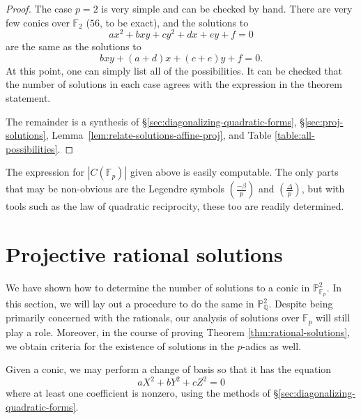 \documentclass[10pt,a4paper]{amsart}
\numberwithin{equation}{section}
\numberwithin{figure}{section}
\numberwithin{table}{section}
\theoremstyle{definition}
\theoremstyle{plain}
\theoremstyle{remark}
\theoremstyle{plain}
\theoremstyle{definition}
\theoremstyle{plain}
\theoremstyle{plain}
\newcommand{\legendre}[2]{\genfrac{(}{)}{}{}{#1}{#2}}
\renewcommand{\P}{\mathbb{P}}
\newcommand{\F}{\mathbb{F}}
\newcommand{\Q}{\mathbb{Q}}
\begin{document}
	\begin{proof} 
		The case $p=2$ is very simple and can be checked by hand. There are very few conics over $\F_2$ ($56$, to be exact), and the solutions to 
		\[ ax^2 + bxy + cy^2 + dx + ey + f = 0 \] 
		are the same as the solutions to 
		\[ bxy + (a+d)x + (c+e)y + f = 0.  \] 
		At this point, one can simply list all of the
		possibilities. It can be checked that the number of solutions in each case agrees with the expression in the theorem statement.
		
		The remainder is a synthesis of \S\ref{sec:diagonalizing-quadratic-forms}, 
		\S\ref{sec:proj-solutions}, Lemma~\ref{lem:relate-solutions-affine-proj}, and Table \ref{table:all-possibilities}.
	\end{proof}
	
	\begin{comment}
	Consolidate with Example~4.4!
	\textcolor{red}{Note that if we are in case \eqref{case:0} of Proposition~\ref{prop:counting-P1-solutions}, i.e., if $a=b=c=0$, then $\gamma$ is a residue if and only if $-1$ is. Thus, by Theorem~\ref{thm:diag-P2}, we cannot be in cases \eqref{case:rank2_x^2+y^2=0} or \eqref{case:rank2_x^2+ry^2=0} of Proposition~\ref{prop:counting-P2-solutions} where the projectivized conic has only $1$ solution. Were this the case, Lemma~\ref{lem:relate-solutions-affine-proj} would imply that our affine conic has a negative number (to be exact, $-p$) of solutions!}
	\end{comment}
	
	The expression for $|C(\F_p)|$ given above is easily computable. The only parts that may be non-obvious are the Legendre symbols $\legendre{-\beta}{p}$ and $\legendre{\Delta}{p}$, but with tools such as the law of quadratic reciprocity, these too are readily determined.
	
	\section{Projective rational solutions}
	\label{sec:rational-soln}
	We have shown how to determine the number of solutions to a conic in $\P^2_{\F_p}$. In this section, we will lay out a procedure to do the same in $\P^2_\Q$. Despite being primarily concerned with the rationals, our analysis of solutions over $\F_p$ will still play a role. Moreover, in the course of proving Theorem \ref{thm:rational-solutions}, we obtain criteria for the existence of solutions in the $p$-adics as well.
	
	Given a conic, we may perform a change of basis so that it has the equation
	\[
	aX^2 + bY^2 + cZ^2 = 0
	\]
	where at least one coefficient is nonzero, using the methods of \S\ref{sec:diagonalizing-quadratic-forms}.
	
\end{document}
